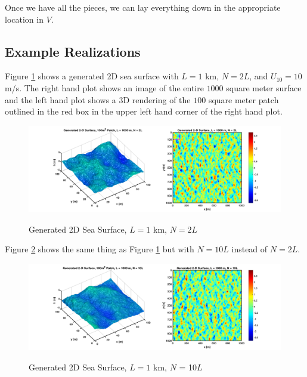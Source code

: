 Once we have all the pieces, we can lay everything down in the appropriate location in $V$.

\subsection {Example Realizations}
Figure \ref{os_fig:8} shows a generated 2D sea surface with $L = 1$ km, $N = 2L$, and $U_{10} = 10$ m/s. The right hand plot shows an image of the entire $1000$ square meter surface and the left hand plot shows a 3D rendering of the $100$ square meter patch outlined in the red box in the upper left hand corner of the right hand plot.

\begin{figure}[H]
  \begin{center}
\includegraphics[width=6in]{../media/Ocean_Surface/sea_surface_2d_surf_1000.png}
  \end{center}
  \renewcommand{\baselinestretch}{1} \small\normalsize
  \begin{quote}
    \caption[Generated 2D Sea Surface, $L = 1$ km, $N=2L$]{Generated 2D Sea Surface, $L = 1$ km, $N=2L$ \label{os_fig:8}}
  \end{quote}
\end{figure}
\renewcommand{\baselinestretch}{2} \small\normalsize

Figure \ref{os_fig:8a} shows the same thing as Figure \ref{os_fig:8} but with $N=10L$ instead of $N = 2L$.

\begin{figure}[H]
  \begin{center}
\includegraphics[width=6in]{../media/Ocean_Surface/sea_surface_2d_surf_1000_10.png}
  \end{center}
  \renewcommand{\baselinestretch}{1} \small\normalsize
  \begin{quote}
    \caption[Generated 2D Sea Surface, $L = 1$ km, $N$ = 10$L$]{Generated 2D Sea Surface, $L = 1$ km, $N$ = 10$L$ \label{os_fig:8a}}
  \end{quote}
\end{figure}
\renewcommand{\baselinestretch}{2} \small\normalsize


